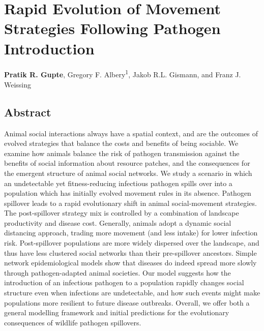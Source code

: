 \chapter{Rapid Evolution of Movement Strategies Following Pathogen Introduction}\label{ch:pathomove}

{\noindent \sffamily\textbf{Pratik R. Gupte}, Gregory F. Albery\textsuperscript{1}, Jakob R.L. Gismann, and Franz J. Weissing}


\section*{Abstract}

\small{
    Animal social interactions always have a spatial context, and are the outcomes of evolved strategies that balance the costs and benefits of being sociable.
    We examine how animals balance the risk of pathogen transmission against the benefits of social information about resource patches, and the consequences for the emergent structure of animal social networks.
    We study a scenario in which an undetectable yet fitness-reducing infectious pathogen spills over into a population which has initially evolved movement rules in its absence.
    Pathogen spillover leads to a rapid evolutionary shift in animal social-movement strategies.
    The post-spillover strategy mix is controlled by a combination of landscape productivity and disease cost.
    Generally, animals adopt a dynamic social distancing approach, trading more movement (and less intake) for lower infection risk.
    Post-spillover populations are more widely dispersed over the landscape, and thus have less clustered social networks than their pre-spillover ancestors.
    Simple network epidemiological models show that diseases do indeed spread more slowly through pathogen-adapted animal societies.
    Our model suggests how the introduction of an infectious pathogen to a population rapidly changes social structure even when infections are undetectable, and how such events might make populations more resilient to future disease outbreaks.
    Overall, we offer both a general modelling framework and initial predictions for the evolutionary consequences of wildlife pathogen spillovers.

    \medskip

}

\clearpage